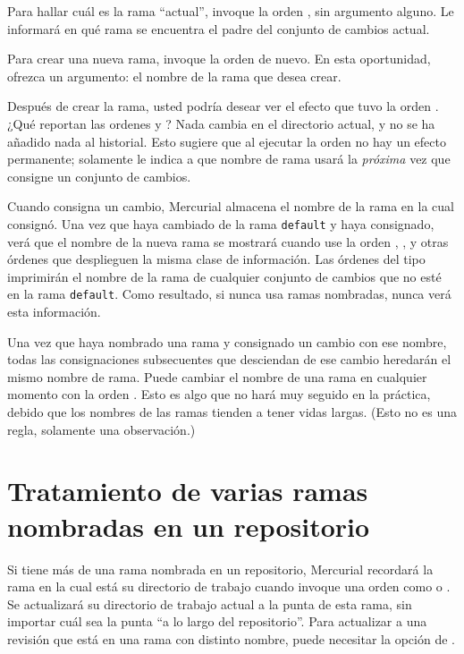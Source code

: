 Para hallar cuál es la rama ``actual'', invoque la orden
, sin argumento alguno. Le informará en qué rama se
encuentra el padre del conjunto de cambios actual.

Para crear una nueva rama, invoque la orden  de
nuevo. En esta oportunidad, ofrezca un argumento: el nombre de la rama
que desea crear.

Después de crear la rama, usted podría desear ver el efecto que tuvo
la orden .  ¿Qué reportan las ordenes  y
?
Nada cambia en el directorio actual, y no se ha añadido nada al
historial. Esto sugiere que al ejecutar la orden  no hay
un efecto permanente; solamente le indica a que nombre de rama usará
la \emph{próxima} vez que consigne un conjunto de cambios.

Cuando consigna un cambio, Mercurial almacena el nombre de la rama en
la cual consignó.  Una vez que haya cambiado de la rama \texttt{default}
y haya consignado, verá que el nombre de la nueva rama se mostrará
cuando use la orden , , y otras órdenes que
desplieguen la misma clase de información.
Las órdenes del tipo  imprimirán el nombre de la rama de
cualquier conjunto de cambios que no esté en la rama
\texttt{default}. Como resultado, si nunca usa ramas nombradas, nunca
verá esta información.

Una vez que haya nombrado una rama y consignado un cambio con ese
nombre, todas las consignaciones subsecuentes que desciendan de ese
cambio heredarán el mismo nombre de rama. Puede cambiar el nombre de
una rama en cualquier momento con la orden .  
Esto es algo que no hará muy seguido en la práctica, debido que los
nombres de las ramas tienden a tener vidas largas.  (Esto no es una
regla, solamente una observación.)

\section{Tratamiento de varias ramas nombradas en un repositorio}

Si tiene más de una rama nombrada en un repositorio, Mercurial
recordará la rama en la cual está su directorio de trabajo cuando
invoque una orden como  o .  Se
actualizará su directorio de trabajo actual a la punta de esta rama, sin
importar cuál sea la punta ``a lo largo del repositorio''.  Para
actualizar a una revisión que está en una rama con distinto nombre,
puede necesitar la opción  de .

